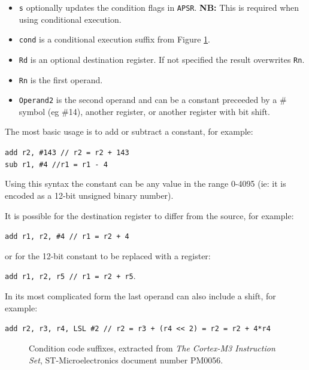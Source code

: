 \documentclass{UoNMCHA}
\numberwithin{equation}{section}
\begin{document}
\begin{itemize}
    \item \texttt{s} optionally updates the condition flags in \texttt{APSR}. \textbf{NB:} This is required when using conditional execution.
    \item \texttt{cond} is a conditional execution suffix from Figure \ref{fig:cond}.
    \item \texttt{Rd} is an optional destination register. If not specified the result overwrites \texttt{Rn}.
    \item \texttt{Rn} is the first operand.
    \item \texttt{Operand2} is the second operand and can be a constant preceeded by a \# symbol (eg \#14), another register, or another register with bit shift.
\end{itemize}

The most basic usage is to add or subtract a constant, for example:

\texttt{add r2, \#143 \quad // r2 = r2 + 143} \\
\texttt{sub r1, \#4 \quad //r1 = r1 - 4}

Using this syntax the constant can be any value in the range 0-4095 (ie: it is encoded as a 12-bit unsigned binary number).

It is possible for the destination register to differ from the source, for example:

\texttt{add r1, r2, \#4 \quad // r1 = r2 + 4}

or for the 12-bit constant to be replaced with a register:

\texttt{add r1, r2, r5 \quad // r1 = r2 + r5}.

In its most complicated form the last operand can also include a shift, for example:

\texttt{add r2, r3, r4, LSL \#2 \quad // r2 = r3 + (r4 << 2) = r2 = r2 + 4*r4}

\begin{figure}[h!]
\caption{Condition code suffixes, extracted from \textit{The Cortex-M3 Instruction Set}, ST-Microelectronics document number PM0056.}
\label{fig:cond}
\end{figure}
\end{document}
